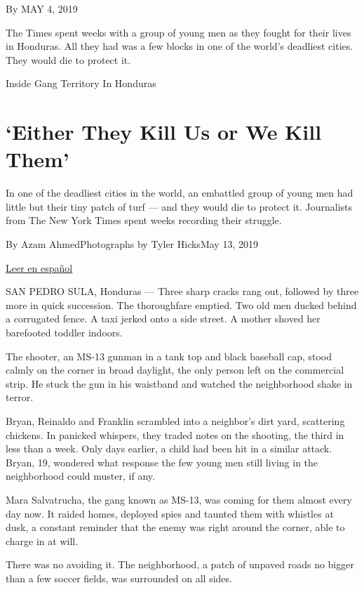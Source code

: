 By MAY 4, 2019

The Times spent weeks with a group of young men as they fought for their
lives in Honduras. All they had was a few blocks in one of the world's
deadliest cities. They would die to protect it.

Inside Gang Territory In Honduras

\hypertarget{either-they-kill-us-or-we-kill-them}{%
\section{`Either They Kill Us or We Kill
Them'}\label{either-they-kill-us-or-we-kill-them}}

In one of the deadliest cities in the world, an embattled group of young
men had little but their tiny patch of turf --- and they would die to
protect it. Journalists from The New York Times spent weeks recording
their struggle.

By Azam AhmedPhotographs by Tyler HicksMay 13, 2019

\href{https://www.nytimes.com/es/2019/05/04/honduras-mara-salvatrucha-violencia/}{Leer
en español}

SAN PEDRO SULA, Honduras --- Three sharp cracks rang out, followed by
three more in quick succession. The thoroughfare emptied. Two old men
ducked behind a corrugated fence. A taxi jerked onto a side street. A
mother shoved her barefooted toddler indoors.

The shooter, an MS-13 gunman in a tank top and black baseball cap, stood
calmly on the corner in broad daylight, the only person left on the
commercial strip. He stuck the gun in his waistband and watched the
neighborhood shake in terror.

Bryan, Reinaldo and Franklin scrambled into a neighbor's dirt yard,
scattering chickens. In panicked whispers, they traded notes on the
shooting, the third in less than a week. Only days earlier, a child had
been hit in a similar attack. Bryan, 19, wondered what response the few
young men still living in the neighborhood could muster, if any.

Mara Salvatrucha, the gang known as MS-13, was coming for them almost
every day now. It raided homes, deployed spies and taunted them with
whistles at dusk, a constant reminder that the enemy was right around
the corner, able to charge in at will.

There was no avoiding it. The neighborhood, a patch of unpaved roads no
bigger than a few soccer fields, was surrounded on all sides.

